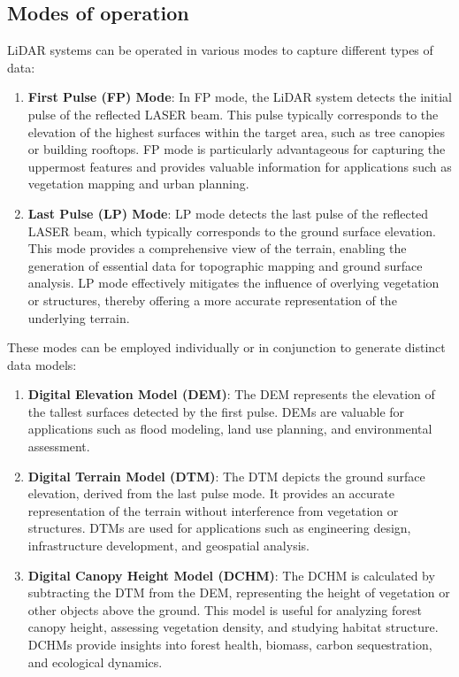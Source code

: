 \documentclass[
  12 pt,
]{Nemilov}
\begin{document}
\subsection{Modes of operation}\label{modes-of-operation}

LiDAR systems can be operated in various modes to capture different types of data:

\begin{enumerate}
\def\labelenumi{\arabic{enumi}.}
\item
  \textbf{First Pulse (FP) Mode}: In FP mode, the LiDAR system detects the initial pulse of the reflected LASER beam. This pulse typically corresponds to the elevation of the highest surfaces within the target area, such as tree canopies or building rooftops. FP mode is particularly advantageous for capturing the uppermost features and provides valuable information for applications such as vegetation mapping and urban planning.
\item
  \textbf{Last Pulse (LP) Mode}: LP mode detects the last pulse of the reflected LASER beam, which typically corresponds to the ground surface elevation. This mode provides a comprehensive view of the terrain, enabling the generation of essential data for topographic mapping and ground surface analysis. LP mode effectively mitigates the influence of overlying vegetation or structures, thereby offering a more accurate representation of the underlying terrain.
\end{enumerate}

These modes can be employed individually or in conjunction to generate distinct data models:

\begin{enumerate}
\def\labelenumi{\arabic{enumi}.}
\item
  \textbf{Digital Elevation Model (DEM)}: The DEM represents the elevation of the tallest surfaces detected by the first pulse. DEMs are valuable for applications such as flood modeling, land use planning, and environmental assessment.
\item
  \textbf{Digital Terrain Model (DTM)}: The DTM depicts the ground surface elevation, derived from the last pulse mode. It provides an accurate representation of the terrain without interference from vegetation or structures. DTMs are used for applications such as engineering design, infrastructure development, and geospatial analysis.
\item
  \textbf{Digital Canopy Height Model (DCHM)}: The DCHM is calculated by subtracting the DTM from the DEM, representing the height of vegetation or other objects above the ground. This model is useful for analyzing forest canopy height, assessing vegetation density, and studying habitat structure. DCHMs provide insights into forest health, biomass, carbon sequestration, and ecological dynamics.
\end{enumerate}
\end{document}

